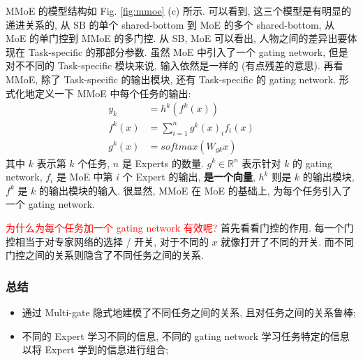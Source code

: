 MMoE 的模型结构如 Fig. \ref{fig:mmoe} (c) 所示. 可以看到, 这三个模型是有明显的递进关系的, 从 SB 的单个 shared-bottom 到 MoE 的多个 shared-bottom, 从 MoE 的单门控到 MMoE 的多门控. 从 SB, MoE 可以看出, 人物之间的差异出要体现在 Task-specific 的那部分参数. 虽然 MoE 中引入了一个 gating network, 但是对不不同的 Task-specific 模块来说, 输入依然是一样的 (有点残差的意思). 再看 MMoE, 除了 Task-specific 的输出模块, 还有 Task-specific 的 gating network. 形式化地定义一下 MMoE 中每个任务的输出:
$$
\begin{aligned}
	y_k &= h^k (f^k (x)) \\ 
	f^k (x) &= \sum_{i=1}^n g^k (x)_i f_i(x)  \\
	g^k (x) &= softmax(W_{gk} x)
\end{aligned}
$$
其中 $k$ 表示第 $k$ 个任务, $n$ 是 Experts 的数量. $g^k \in \mathbb{R}^n$ 表示针对 $k$ 的 gating network, $f_i$ 是 MoE 中第 $i$ 个 Expert 的输出, \textbf{是一个向量}, $h^k$ 则是 $k$ 的输出模块, $f^k$ 是 $k$ 的输出模块的输入. 很显然, MMoE 在 MoE 的基础上, 为每个任务引入了一个 gating network.

\textcolor{red}{为什么为每个任务加一个 gating network 有效呢?} 首先看看门控的作用. 每一个门控相当于对专家网络的选择 / 开关, 对于不同的 $x$ 就像打开了不同的开关. 而不同门控之间的关系则隐含了不同任务之间的关系.

\subsubsection{总结}
\begin{itemize}
	\item 通过 Multi-gate 隐式地建模了不同任务之间的关系, 且对任务之间的关系鲁棒;
	
	\item 不同的 Expert 学习不同的信息, 不同的 gating network 学习任务特定的信息以将 Expert 学到的信息进行组合;
\end{itemize}